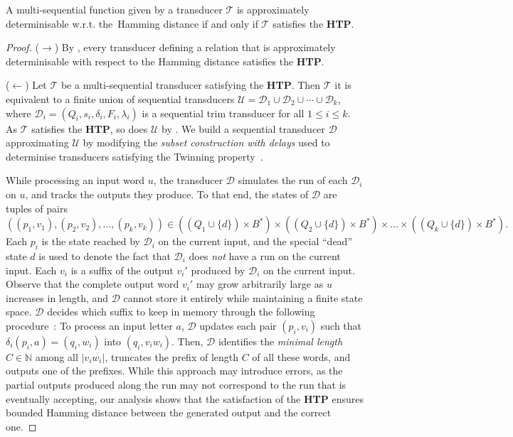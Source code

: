 \documentclass[a4paper,UKenglish,cleveref, autoref, thm-restate,authorcolumns, colorlinks]{lipics-v2021}
\newcommand\calD{\mathcal{D}}
\newcommand\calT{\mathcal{T}}
\newcommand\calU{\mathcal{U}}
\newcommand{\HTP}[0]{\textbf{HTP}}
\begin{document}
{\begin{lemma} \label{lemma:multiseqapproxHamming}
    A multi-sequential function given by a transducer $\calT$
    is approximately determinisable w.r.t. the~Hamming distance
    if and only if $\calT$ satisfies the \HTP{}.
\end{lemma}

\begin{proof}
    ($\rightarrow$) By ,
    every transducer defining a relation that is
    approximately determinisable 
    with respect to the Hamming distance satisfies the \HTP{}.
    
    ($\leftarrow$) Let $\calT$ be a multi-sequential transducer satisfying the \HTP{}.
    Then $\calT$
    it is equivalent to a finite union of sequential transducers
    $\calU = \calD_1 \cup \calD_2 \cup \cdots \cup \calD_k$,
    where $\calD_i = (Q_i,s_i,\delta_i,F_i,\lambda_i)$
    is a sequential trim transducer for all $1 \leq i \leq k$.
    As $\calT$ satisfies the \HTP{},
    so does $\calU$ by .
    We build a sequential transducer $\calD$ approximating $\calU$
    by modifying the \emph{subset construction with delays}
    used to determinise transducers satisfying the Twinning property~\cite{twinningproperty,twinningproperty0}.
    
    While processing an input word $u$,
    the transducer $\calD$ simulates the run of each $\calD_i$ on $u$,
    and tracks the outputs they produce.
    To that end, the states of $\calD$ are tuples of pairs
    \[
        ((p_1,v_1),(p_2,v_2), \ldots, (p_k,v_k)) \in
        ((Q_1 \cup \{d\}) \times B^*) \times ((Q_2\cup \{d\}) \times B^*) \times \ldots \times ((Q_k\cup \{d\}) \times B^*).
    \]
    Each $p_i$ is the state reached by $\calD_i$
    on the current input, and the special ``dead'' state $d$ is used to denote the fact that $\calD_i$
    does \emph{not} have a run on the current input.
    Each $v_i$ is a suffix of the output $v_i'$ produced by $\calD_i$
    on the current input.
    Observe that the complete output word $v_i'$ 
    may grow arbitrarily large as $u$ increases in length,
    and $\calD$ cannot store it entirely while maintaining a finite state space.
    $\calD$ decides which suffix to keep in memory
    through the following procedure~:
    To process an input letter $a$,
    $\calD$ updates each pair $(p_i,v_i)$ such that $\delta_i(p_i,a) = (q_i,w_i)$ into 
    $(q_i,v_iw_i)$.
    Then, $\calD$ identifies the \emph{minimal length} $C \in \mathbb{N}$ among all $|v_iw_i|$,
    truncates the prefix of length $C$ of all these words,
    and outputs one of the prefixes.
    While this approach may introduce errors, as the partial outputs produced along the run
    may not correspond to the run that is eventually accepting,
    our analysis shows that the satisfaction of the \HTP{}
    ensures bounded Hamming distance between the generated output
    and the correct one.
    

\end{proof}}
\end{document}
